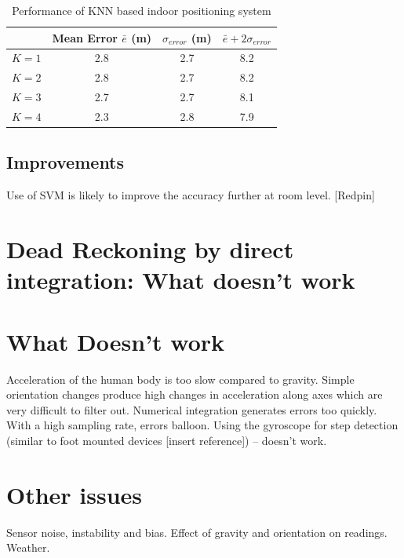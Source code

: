 \begin{table}[h]
    \centering
    \caption{Performance of KNN based indoor positioning system \label{tab:knnperf}}
    \begin{tabular}{|l|c|c|c|}
    \hline
              & Mean Error $\bar{e}$ (m) & $\sigma_{error}$ (m) & $\bar{e} + 2 \sigma_{error}$ \\
    \hline
    \hline
    $K = 1$    & 2.8 & 2.7 & 8.2 \\
    $K = 2$    & 2.8 & 2.7 & 8.2 \\
    $K = 3$    & 2.7 & 2.7 & 8.1 \\
    $K = 4$    & 2.3 & 2.8 & 7.9 \\
    \hline
    \end{tabular}

\end{table}


\subsection{Improvements}
Use of SVM is likely to improve the accuracy further at room level. [Redpin]


\section{Dead Reckoning by direct integration: What doesn't work}
\section{What Doesn't work}
Acceleration of the human body is too slow compared to gravity. Simple orientation changes produce high changes in acceleration along axes which are very difficult to filter out.
Numerical integration generates errors too quickly. With a high sampling rate, errors balloon.
Using the gyroscope for step detection (similar to foot mounted devices [insert reference]) – doesn’t work.


\section{Other issues}
Sensor noise, instability and bias. Effect of gravity and orientation on readings. Weather.

